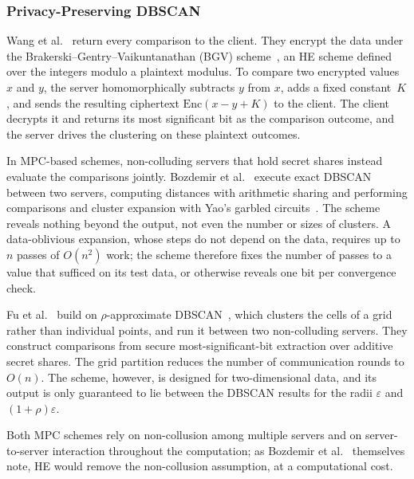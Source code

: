 \subsubsection{Privacy-Preserving DBSCAN}
Wang et al.~\cite{wang2022homomorphic} return every comparison to the client. They
encrypt the data under the Brakerski--Gentry--Vaikuntanathan (BGV)
scheme~\cite{brakerski2012leveled}, an HE scheme defined over the
integers modulo a plaintext modulus. To
compare two encrypted values $x$ and $y$, the server homomorphically
subtracts $y$ from $x$, adds a fixed constant~$K$, and sends the resulting
ciphertext $\mathrm{Enc}(x - y + K)$ to the client. The client decrypts it
and returns its most significant bit as the comparison outcome, and the
server drives the clustering on these plaintext outcomes.

In MPC-based schemes, non-colluding servers that hold secret shares
instead evaluate the comparisons jointly. Bozdemir
et al.~\cite{bozdemir2021privacy} execute exact DBSCAN between two
servers, computing distances with arithmetic sharing and performing
comparisons and cluster expansion with Yao's garbled
circuits~\cite{yao1986generate}. The scheme reveals nothing beyond the
output, not even the number or sizes of clusters. A data-oblivious
expansion, whose steps do not depend on the data, requires up to $n$
passes of $O(n^2)$ work; the scheme therefore fixes the number of passes
to a value that sufficed on its test data, or otherwise reveals one bit
per convergence check.

Fu et al.~\cite{fu2024ppa} build on $\rho$-approximate
DBSCAN~\cite{gan2015dbscan}, which clusters the cells of a grid rather
than individual points, and run it between two non-colluding servers.
They construct comparisons from secure most-significant-bit extraction
over additive secret shares. The grid partition reduces the number of
communication rounds to $O(n)$. The scheme, however, is designed for
two-dimensional data, and its output is only guaranteed to lie between
the DBSCAN results for the radii $\varepsilon$ and
$(1+\rho)\varepsilon$.

Both MPC schemes rely on non-collusion among multiple servers and on
server-to-server interaction throughout the computation; as Bozdemir
et al.~\cite{bozdemir2021privacy} themselves note, HE would remove the
non-collusion assumption, at a computational cost.

